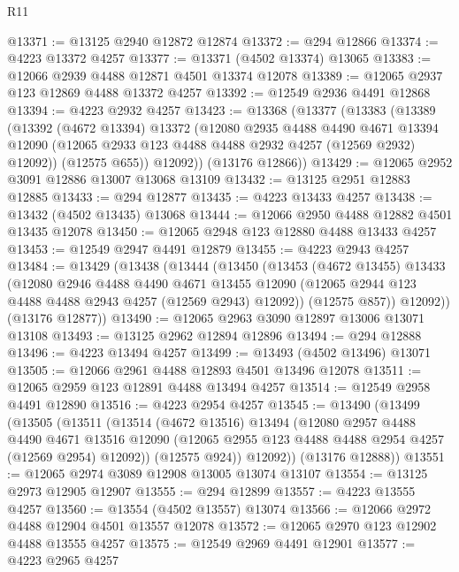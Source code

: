 \begin{lexlean}{R11}
\begin{coremodule}
@13371 := @13125 @2940 @12872 @12874
@13372 := @294 @12866
@13374 := @4223 @13372 @4257
@13377 := @13371 (@4502 @13374) @13065
@13383 := @12066 @2939 @4488 @12871 @4501 @13374 @12078
@13389 := @12065 @2937 @123 @12869 @4488 @13372 @4257
@13392 := @12549 @2936 @4491 @12868
@13394 := @4223 @2932 @4257
@13423 := @13368
    (@13377
      (@13383
        (@13389
          (@13392
            (@4672 @13394)
            @13372
            (@12080
              @2935
              @4488
              @4490
              @4671
              @13394
              @12090
              (@12065 @2933 @123 @4488 @4488 @2932 @4257 (@12569 @2932) @12092))
            (@12575 @655))
          @12092))
      (@13176 @12866))
@13429 := @12065 @2952 @3091 @12886 @13007 @13068 @13109
@13432 := @13125 @2951 @12883 @12885
@13433 := @294 @12877
@13435 := @4223 @13433 @4257
@13438 := @13432 (@4502 @13435) @13068
@13444 := @12066 @2950 @4488 @12882 @4501 @13435 @12078
@13450 := @12065 @2948 @123 @12880 @4488 @13433 @4257
@13453 := @12549 @2947 @4491 @12879
@13455 := @4223 @2943 @4257
@13484 := @13429
    (@13438
      (@13444
        (@13450
          (@13453
            (@4672 @13455)
            @13433
            (@12080
              @2946
              @4488
              @4490
              @4671
              @13455
              @12090
              (@12065 @2944 @123 @4488 @4488 @2943 @4257 (@12569 @2943) @12092))
            (@12575 @857))
          @12092))
      (@13176 @12877))
@13490 := @12065 @2963 @3090 @12897 @13006 @13071 @13108
@13493 := @13125 @2962 @12894 @12896
@13494 := @294 @12888
@13496 := @4223 @13494 @4257
@13499 := @13493 (@4502 @13496) @13071
@13505 := @12066 @2961 @4488 @12893 @4501 @13496 @12078
@13511 := @12065 @2959 @123 @12891 @4488 @13494 @4257
@13514 := @12549 @2958 @4491 @12890
@13516 := @4223 @2954 @4257
@13545 := @13490
    (@13499
      (@13505
        (@13511
          (@13514
            (@4672 @13516)
            @13494
            (@12080
              @2957
              @4488
              @4490
              @4671
              @13516
              @12090
              (@12065 @2955 @123 @4488 @4488 @2954 @4257 (@12569 @2954) @12092))
            (@12575 @924))
          @12092))
      (@13176 @12888))
@13551 := @12065 @2974 @3089 @12908 @13005 @13074 @13107
@13554 := @13125 @2973 @12905 @12907
@13555 := @294 @12899
@13557 := @4223 @13555 @4257
@13560 := @13554 (@4502 @13557) @13074
@13566 := @12066 @2972 @4488 @12904 @4501 @13557 @12078
@13572 := @12065 @2970 @123 @12902 @4488 @13555 @4257
@13575 := @12549 @2969 @4491 @12901
@13577 := @4223 @2965 @4257

\end{coremodule}
\end{lexlean}
